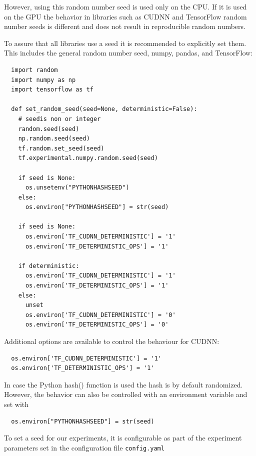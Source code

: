 \documentclass[sigplan,screen]{acmart}
\begin{document}
However, using this random number seed is used only on the CPU. If it is used on the GPU the behavior in libraries such as CUDNN \cite{www-cudnn-seed} and TensorFlow random number seeds is different and does not result in reproducible random numbers. 


To assure that all libraries use a seed it is recommended to explicitly set them. This includes the general random number seed, numpy, pandas, and TensorFlow:

{\footnotesize
\begin{verbatim}
  import random
  import numpy as np
  import tensorflow as tf

  def set_random_seed(seed=None, deterministic=False):
    # seedis non or integer
    random.seed(seed)
    np.random.seed(seed)
    tf.random.set_seed(seed)
    tf.experimental.numpy.random.seed(seed)

    if seed is None:
      os.unsetenv("PYTHONHASHSEED")
    else:
      os.environ["PYTHONHASHSEED"] = str(seed)

    if seed is None:
      os.environ['TF_CUDNN_DETERMINISTIC'] = '1'
      os.environ['TF_DETERMINISTIC_OPS'] = '1'

    if deterministic:
      os.environ['TF_CUDNN_DETERMINISTIC'] = '1'
      os.environ['TF_DETERMINISTIC_OPS'] = '1'
    else:
      unset 
      os.environ['TF_CUDNN_DETERMINISTIC'] = '0'
      os.environ['TF_DETERMINISTIC_OPS'] = '0'
\end{verbatim}}

Additional options are available to control the behaviour for CUDNN:

{\footnotesize
\begin{verbatim}
  os.environ['TF_CUDNN_DETERMINISTIC'] = '1'
  os.environ['TF_DETERMINISTIC_OPS'] = '1'
\end{verbatim}}

In case the Python hash() function is used the hash is by default randomized. However, the behavior can also be controlled with an environment variable and set with 

{\footnotesize
\begin{verbatim}
  os.environ["PYTHONHASHSEED"] = str(seed)
\end{verbatim}}


To set a seed for our experiments, it is configurable as part of the  experiment parameters set in the configuration file \verb|config.yaml|
\end{document}
